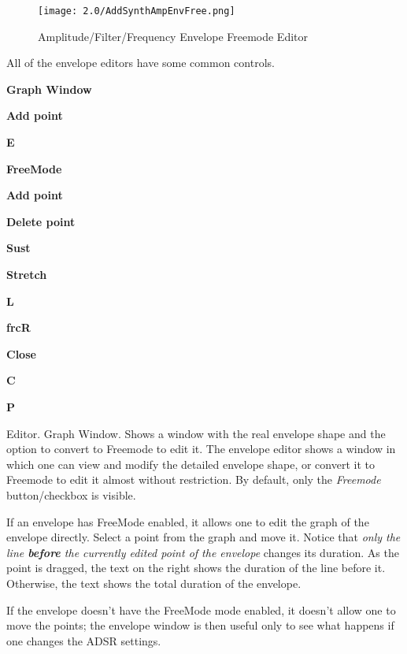 \begin{figure}[H]
   \centering
   \texttt{[image: 2.0/AddSynthAmpEnvFree.png]}
   \caption{Amplitude/Filter/Frequency Envelope Freemode Editor}
   \label{fig:amplitude_envelope_freemode}
\end{figure}

   All of the envelope editors have some common controls.

   \begin{enumber}
      \item \textbf{Graph Window}
      \item \textbf{Add point}
      \item \textbf{E}
      \item \textbf{FreeMode}
      \item \textbf{Add point}
      \item \textbf{Delete point}
      \item \textbf{Sust}
      \item \textbf{Stretch}
      \item \textbf{L}
      \item \textbf{frcR}
      \item \textbf{Close}
      \item \textbf{C}
      \item \textbf{P}
   \end{enumber}

   \setcounter{ItemCounter}{0}      %

   Editor.  Graph Window.
   Shows a window with the real envelope shape and the option to convert to
   Freemode to edit it.
   The envelope editor shows a window in which one can view and modify the
   detailed envelope shape, or convert it to Freemode to edit it almost
   without restriction.
   By default, only the \textsl{Freemode} button/checkbox is visible.

   If an envelope has FreeMode enabled, it allows one to edit the
   graph of the envelope directly. Select a point from the graph and move it.
   Notice that
   \textsl{only the line \textbf{before} the currently edited point of the
   envelope} changes its duration.
   As the point is dragged, the text on the right shows the duration of
   the line before it. Otherwise, the text shows the total duration of the
   envelope.

   If the envelope doesn't have the FreeMode mode enabled, it doesn't allow
   one to move the points; the envelope window is then useful only to see
   what happens if one changes the ADSR settings.

